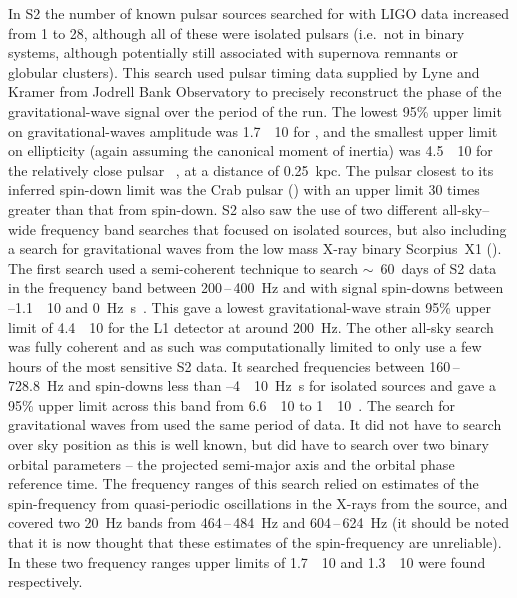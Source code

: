 In S2 the number of known pulsar sources searched for with LIGO data increased from 1 to 28, although all of 
these were isolated pulsars (i.e.\ not in binary systems, although potentially still associated with 
supernova remnants or globular clusters). This search used pulsar timing data supplied by Lyne and Kramer 
from Jodrell Bank Observatory to precisely reconstruct the phase of the gravitational-wave signal over the 
period of the run. The lowest 95\% upper limit on gravitational-waves amplitude was
1.7~\texttimes~10 for , and the smallest upper limit on ellipticity 
(again assuming the canonical moment of inertia) was 4.5~\texttimes~10 for the relatively close
pulsar ~\cite{Abbott:2005f}, at a distance of 0.25~kpc. The pulsar closest to 
its inferred spin-down limit was the Crab pulsar () with an upper limit 30 times 
greater than that from spin-down. S2 also saw the use of two different all-sky--wide frequency band searches 
that focused on isolated sources, but also including a search for gravitational waves from the low mass X-ray
binary Scorpius~X1 (). The first search used a semi-coherent technique to 
search $\sim$~60~days of S2 data in the frequency band between 200\,--\,400~Hz and with signal spin-downs 
between --1.1~\texttimes~10 and 0~Hz~s~\cite{Abbott:2005g}. This gave a lowest 
gravitational-wave strain 95\% upper limit of 4.4~\texttimes~10 for the L1 detector at around 
200~Hz. The other all-sky search was fully coherent and as such was computationally limited to only use a few
hours of the most sensitive S2 data. It searched frequencies between 160\,--\,728.8~Hz and spin-downs less 
than --4~\texttimes~10~Hz~s for isolated sources and gave a 95\% upper limit across this 
band from 6.6~\texttimes~10 to 1~\texttimes~10~\cite{Abbott:2007a}. The search for 
gravitational waves from  used the same period of data. It did not have to 
search over sky position as this is well known, but did have to search over two binary orbital parameters -- 
the projected semi-major axis and the orbital phase reference time. The frequency ranges of this search 
relied on estimates of the spin-frequency from quasi-periodic oscillations in the X-rays from the source, and 
covered two 20~Hz bands from 464\,--\,484~Hz and 604\,--\,624~Hz (it should be noted that it is now
thought that these estimates of the spin-frequency are unreliable). In these two frequency ranges upper 
limits of 1.7~\texttimes~10 and 1.3~\texttimes~10 were found respectively.

